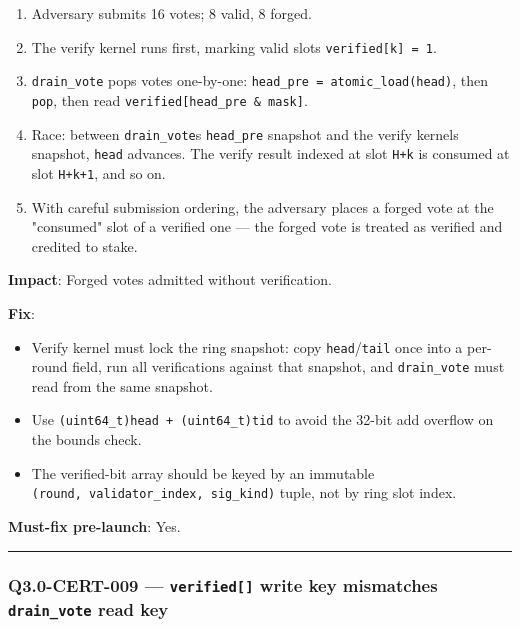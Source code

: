\documentclass[
]{article}
\providecommand{\tightlist}{%
  \setlength{\itemsep}{0pt}\setlength{\parskip}{0pt}}
\begin{document}
\begin{enumerate}
\def\labelenumi{\arabic{enumi}.}
\tightlist
\item
  Adversary submits 16 votes; 8 valid, 8 forged.
\item
  The verify kernel runs first, marking valid slots
  \texttt{verified{[}k{]}\ =\ 1}.
\item
  \texttt{drain\_vote} pops votes one-by-one:
  \texttt{head\_pre\ =\ atomic\_load(head)}, then \texttt{pop}, then
  read \texttt{verified{[}head\_pre\ \&\ mask{]}}.
\item
  Race: between \texttt{drain\_vote}\textquotesingle s
  \texttt{head\_pre} snapshot and the verify kernel\textquotesingle s
  snapshot, \texttt{head} advances. The verify result indexed at slot
  \texttt{H+k} is consumed at slot \texttt{H+k+1}, and so on.
\item
  With careful submission ordering, the adversary places a forged vote
  at the "consumed" slot of a verified one --- the forged vote is
  treated as verified and credited to stake.
\end{enumerate}

\textbf{Impact}: Forged votes admitted without verification.

\textbf{Fix}:

\begin{itemize}
\tightlist
\item
  Verify kernel must lock the ring snapshot: copy
  \texttt{head}/\texttt{tail} once into a per-round field, run all
  verifications against that snapshot, and \texttt{drain\_vote} must
  read from the same snapshot.
\item
  Use \texttt{(uint64\_t)head\ +\ (uint64\_t)tid} to avoid the 32-bit
  add overflow on the bounds check.
\item
  The verified-bit array should be keyed by an immutable
  \texttt{(round,\ validator\_index,\ sig\_kind)} tuple, not by ring
  slot index.
\end{itemize}

\textbf{Must-fix pre-launch}: Yes.

\begin{center}\rule{0.5\linewidth}{0.5pt}\end{center}

\subsubsection{\texorpdfstring{Q3.0-CERT-009 --- \texttt{verified{[}{]}}
write key mismatches \texttt{drain\_vote} read
key}{Q3.0-CERT-009 --- verified{[}{]} write key mismatches drain\_vote read key}}\label{q30-cert-009--verified-write-key-mismatches-drain_vote-read-key}
\end{document}
